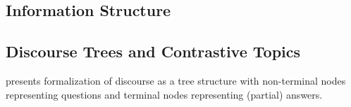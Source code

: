 \documentclass[letterpaper]{article}
\begin{document}
\subsection{Information Structure}

\subsection{Discourse Trees and Contrastive Topics}
\textcite{buring2003d} presents  formalization of discourse as a tree structure with non-terminal nodes representing questions and terminal nodes representing (partial) answers.

\printbibliography
\end{document}
